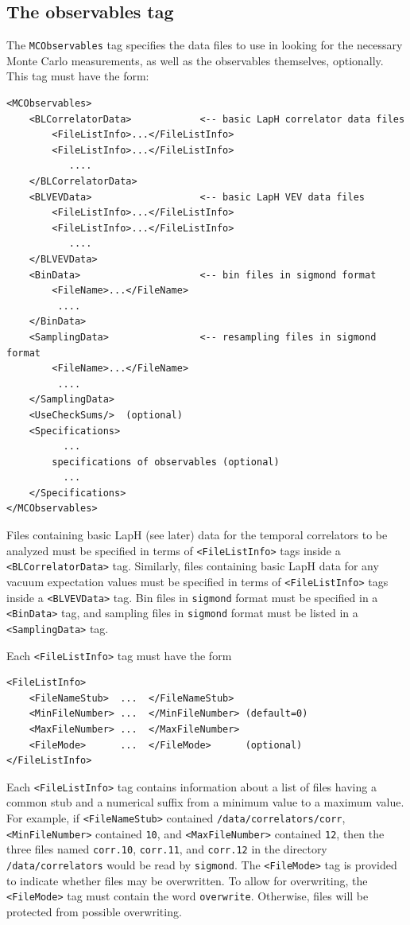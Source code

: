 \documentclass[12pt]{article}
\newcommand{\vb}{\texttt}
\begin{document}
\subsection{The observables tag}
The \vb{MCObservables} tag specifies the data files to use in looking
for the necessary Monte Carlo measurements, as well as the observables
themselves, optionally.  This tag must have the form:
\begin{verbatim}
<MCObservables>
    <BLCorrelatorData>            <-- basic LapH correlator data files
        <FileListInfo>...</FileListInfo>
        <FileListInfo>...</FileListInfo>
           ....
    </BLCorrelatorData>
    <BLVEVData>                   <-- basic LapH VEV data files
        <FileListInfo>...</FileListInfo>
        <FileListInfo>...</FileListInfo>
           ....
    </BLVEVData>
    <BinData>                     <-- bin files in sigmond format
        <FileName>...</FileName>
         ....
    </BinData>
    <SamplingData>                <-- resampling files in sigmond format
        <FileName>...</FileName>
         ....
    </SamplingData>
    <UseCheckSums/>  (optional)
    <Specifications>
          ...
        specifications of observables (optional)
          ...
    </Specifications>
</MCObservables>
\end{verbatim}

Files containing basic LapH (see later) data for the temporal correlators to be analyzed
must be specified in terms of \vb{<FileListInfo>} tags inside a
\vb{<BLCorrelatorData>} tag.  Similarly, files containing basic LapH data for
any vacuum expectation values must be specified in terms
of \vb{<FileListInfo>} tags inside a \vb{<BLVEVData>} tag.  Bin files
in \vb{sigmond} format must be specified in a \vb{<BinData>} tag, and sampling files
in \vb{sigmond} format must be listed in a \vb{<SamplingData>} tag.

Each \vb{<FileListInfo>} tag must have the form
\begin{verbatim}
<FileListInfo>
    <FileNameStub>  ...  </FileNameStub>
    <MinFileNumber> ...  </MinFileNumber> (default=0)
    <MaxFileNumber> ...  </MaxFileNumber>
    <FileMode>      ...  </FileMode>      (optional)
</FileListInfo>
\end{verbatim}
Each \vb{<FileListInfo>} tag contains information about a list of files
having a common stub and a numerical suffix from a minimum value to a
maximum value. For example, if \vb{<FileNameStub>} contained
\vb{/data/correlators/corr}, \vb{<MinFileNumber>} contained
\vb{10}, and \vb{<MaxFileNumber>} contained \vb{12}, then
the three files named \vb{corr.10}, \vb{corr.11}, and \vb{corr.12}
in the directory \vb{/data/correlators} would be read by \vb{sigmond}.
The \vb{<FileMode>} tag is provided to indicate whether
files may be overwritten. To allow for overwriting, the
\vb{<FileMode>} tag must contain the word \vb{overwrite}. Otherwise,
files will be protected from possible overwriting.
\end{document}
